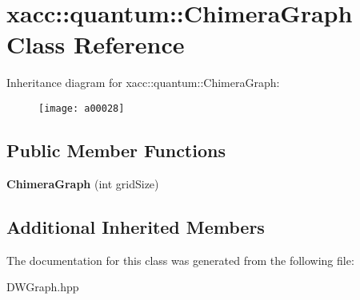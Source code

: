 \hypertarget{a00028}{}\section{xacc\+:\+:quantum\+:\+:Chimera\+Graph Class Reference}
\label{a00028}
Inheritance diagram for xacc\+:\+:quantum\+:\+:Chimera\+Graph\+:\begin{figure}[H]
\begin{center}
\leavevmode
\texttt{[image: a00028]}
\end{center}
\end{figure}
\subsection*{Public Member Functions}
\begin{DoxyCompactItemize}
\item 
{\bfseries Chimera\+Graph} (int grid\+Size)\hypertarget{a00028_a64f23e464ba85d6625fe1fc2d2608052}{}\label{a00028_a64f23e464ba85d6625fe1fc2d2608052}

\end{DoxyCompactItemize}
\subsection*{Additional Inherited Members}


The documentation for this class was generated from the following file\+:\begin{DoxyCompactItemize}
\item 
D\+W\+Graph.\+hpp\end{DoxyCompactItemize}

